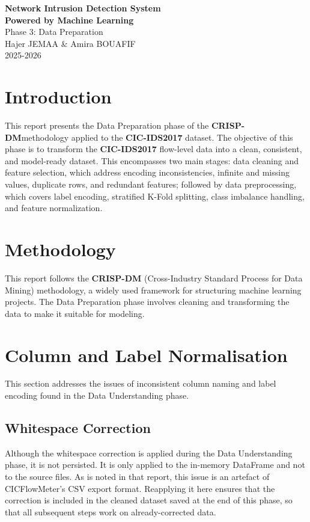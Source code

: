 \documentclass[12pt,a4paper]{article}
\begin{document}
\begin{titlepage}
    \centering
    \vspace*{6.5cm}
    {\LARGE \textbf{Network Intrusion Detection System} \\[0.5em]
        \textbf{Powered by Machine Learning}}\\[2cm]
    {\large Phase 3: Data Preparation}\\[2cm]
    {\large Hajer JEMAA \& Amira BOUAFIF}\\[0.5cm]
    \vfill
    {\large 2025-2026}\\[1cm]
\end{titlepage}

\section{Introduction}

This report presents the Data Preparation phase of the \textbf{CRISP-DM}methodology applied to the \textbf{CIC-IDS2017} dataset. The objective of this phase is to transform the \textbf{CIC-IDS2017} flow-level data into a clean, consistent, and model-ready dataset. This encompasses two main stages: data cleaning and feature selection, which address encoding inconsistencies, infinite and missing values, duplicate rows, and redundant features; followed by data preprocessing, which covers label encoding, stratified K-Fold splitting, class imbalance handling, and feature normalization.

\section{Methodology}
This report follows the \textbf{CRISP-DM} (Cross-Industry Standard Process for Data Mining) methodology, a widely used framework for structuring machine learning projects. The Data Preparation phase involves cleaning and transforming the data to make it suitable for modeling.

\section{Column and Label Normalisation}
This section addresses the issues of inconsistent column naming and label encoding found in the Data Understanding phase.

\subsection{Whitespace Correction}
Although the whitespace correction is applied during the Data Understanding phase, it is not persisted. It is only applied to the in-memory DataFrame and not to the source files. As is noted in that report, this issue is an artefact of CICFlowMeter's CSV export format. Reapplying it here ensures that the correction is included in the cleaned dataset saved at the end of this phase, so that all subsequent steps work on already-corrected data.
\end{document}
